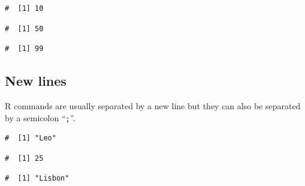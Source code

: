 \documentclass[a4paper,9pt,twocolumn,twoside,printwatermark=false]{pinp}
\begin{document}
\begin{ShadedResult}
\begin{verbatim}
#  [1] 10
\end{verbatim}
\end{ShadedResult}

\begin{Shaded}
\begin{Highlighting}[]
\end{Highlighting}
\end{Shaded}

\begin{ShadedResult}
\begin{verbatim}
#  [1] 50
\end{verbatim}
\end{ShadedResult}

\begin{Shaded}
\begin{Highlighting}[]
\end{Highlighting}
\end{Shaded}

\begin{ShadedResult}
\begin{verbatim}
#  [1] 99
\end{verbatim}
\end{ShadedResult}

\subsection{New lines}\label{new-lines}

R commands are usually separated by a new line but they can also be
separated by a semicolon ``\texttt{;}''.

\begin{Shaded}
\begin{Highlighting}[]
\StringTok{ }
\end{Highlighting}
\end{Shaded}

\begin{ShadedResult}
\begin{verbatim}
#  [1] "Leo"
\end{verbatim}
\end{ShadedResult}\begin{ShadedResult}
\begin{verbatim}
#  [1] 25
\end{verbatim}
\end{ShadedResult}\begin{ShadedResult}
\begin{verbatim}
#  [1] "Lisbon"
\end{verbatim}
\end{ShadedResult}
\end{document}

